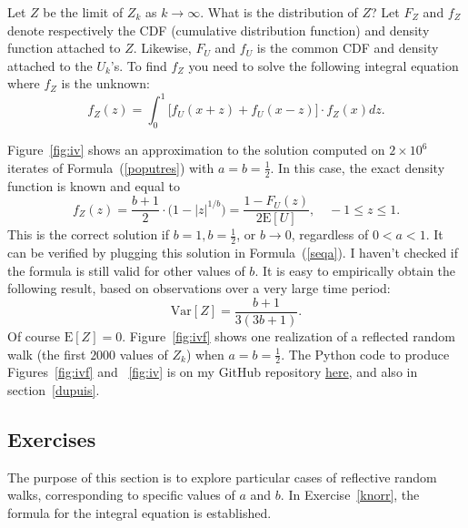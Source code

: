 \documentclass[oneside,10pt]{book}
\begin{document}
 Let $Z$ be the limit of $Z_k$ as $k\rightarrow\infty$.  What is the
 distribution of $Z$? Let $F_Z$ and $f_Z$ denote respectively the CDF (cumulative distribution function) and density function attached to $Z$.
 Likewise, $F_U$ and $f_U$ is the common CDF and density attached to the $U_k$'s. To find $f_Z$ you need to solve the following integral equation where $f_Z$ is the unknown:
\begin{equation}
f_Z(z) = \int_0^1 \Big[f_U(x+z) + f_U(x-z)\Big]\cdot f_Z(x) dz. \label{seqa}
\end{equation}

Figure~\ref{fig:iv} shows an approximation to the solution computed on $2\times 10^6$ iterates of Formula~(\ref{poputres}) with 
$a=b=\frac{1}{2}$. In this case, the exact density function is known and equal to 
$$
f_Z(z) = \frac{b+1}{2}\cdot \Big(1-|z|^{1/b}\Big) = \frac{1-F_U(z)}{2 \text{E}[U]}, \quad -1\leq z \leq 1.
$$
This is the correct solution if $b=1,b=\frac{1}{2}$, or $b\rightarrow 0$, regardless of $0<a<1$. It can be verified by plugging this solution in Formula~(\ref{seqa}). I haven't checked if the formula is still valid for other values of $b$. It is easy to empirically obtain the following result, 
 based on observations over a very large time period:
$$
\text{Var}[Z] = \frac{b+1}{3(3b+1)}.
$$
Of course $\text{E}[Z]=0$. Figure~\ref{fig:ivf} shows one realization of a reflected random walk (the first $2000$ values of $Z_k$) when $a=b=\frac{1}{2}$. The Python code to produce Figures~\ref{fig:ivf} and ~\ref{fig:iv} is on my GitHub repository 
 \href{https://github.com/VincentGranville/Stochastic-Processes/blob/master/brownian_reflective.py}{here}, and also in 
 section~\ref{dupuis}.

\subsection{Exercises}

The purpose of this section is to explore particular cases of reflective random walks, corresponding to specific values of $a$ and $b$. 
In Exercise~\ref{knorr}, the formula for the integral equation is established. 
\end{document}
